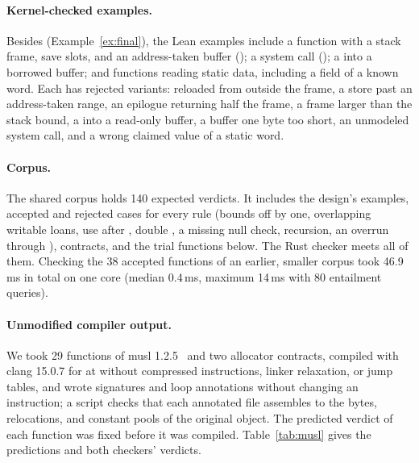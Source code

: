 \paragraph{Kernel-checked examples.} Besides  (Example~\ref{ex:final}), the Lean examples include a function with a stack frame, save slots, and an address-taken buffer (); a  system call (); a  into a borrowed buffer; and functions reading static data, including a field of a known word. Each has rejected variants:  reloaded from outside the frame, a store past an address-taken range, an epilogue returning half the frame, a frame larger than the stack bound, a  into a read-only buffer, a buffer one byte too short, an unmodeled system call, and a wrong claimed value of a static word.

\paragraph{Corpus.} The shared corpus holds 140 expected verdicts. It includes the design's examples, accepted and rejected cases for every rule (bounds off by one, overlapping writable loans, use after , double , a missing null check, recursion, an overrun through ), contracts, and the trial functions below. The Rust checker meets all of them. Checking the 38 accepted functions of an earlier, smaller corpus took 46.9\,ms in total on one core (median 0.4\,ms, maximum 14\,ms with 80 entailment queries).

\paragraph{Unmodified compiler output.} We took 29 functions of musl 1.2.5~\cite{musl} and two allocator contracts, compiled with clang 15.0.7 for  at  without compressed instructions, linker relaxation, or jump tables, and wrote signatures and loop annotations without changing an instruction; a script checks that each annotated file assembles to the bytes, relocations, and constant pools of the original object. The predicted verdict of each function was fixed before it was compiled. Table~\ref{tab:musl} gives the predictions and both checkers' verdicts.

